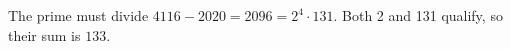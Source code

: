 The prime must divide $4116-2020=2096=2^4\cdot131$. Both 2 and 131 qualify, so their sum is $\boxed{133}$.
